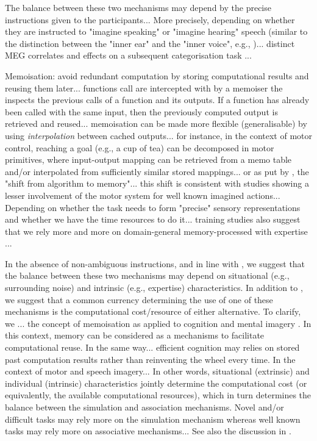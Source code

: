 \documentclass[utf8]{template/frontiersSCNS} %
\begin{document}
The balance between these two mechanisms may depend by the precise instructions given to the participants... More precisely, depending on whether they are instructed to "imagine speaking" or "imagine hearing" speech (similar to the distinction between the "inner ear" and the "inner voice", e.g., \cite{smith_subvocalization_1992})... distinct MEG correlates and effects on a subsequent categorisation task \citep{ma_distinct_2019}...

Memoisation: avoid redundant computation by storing computational results and reusing them later... functions call are intercepted with by a memoiser the inspects the previous calls of a function and its outputs. If a function has already been called with the same input, then the previously computed output is retrieved and reused... memoisation can be made more flexible (generalisable) by using \textit{interpolation} between cached outputs... for instance, in the context of motor control, reaching a goal (e.g., a cup of tea) can be decomposed in motor primitives, where input-output mapping can be retrieved from a memo table and/or interpolated from sufficiently similar stored mappings... or as put by \cite{dasgupta_memory_2021}, the "shift from algorithm to memory"... this shift is consistent with studies showing a lesser involvement of the motor system for well known imagined actions... Depending on whether the task needs to form "precise" sensory representations and whether we have the time resources to do it... training studies also suggest that we rely more and more on domain-general memory-processed with expertise \cite{tarr_mental_1989, jolicoeur_time_1985}...

In the absence of non-ambiguous instructions, and in line with \cite{tian_mental_2012}, we suggest that the balance between these two mechanisms may depend on situational (e.g., surrounding noise) and intrinsic (e.g., expertise) characteristics. In addition to \cite{tian_mental_2012}, we suggest that a common currency determining the use of one of these mechanisms is the computational cost/resource of either alternative. To clarify, we ... the concept of memoisation as applied to cognition and mental imagery \citep{dasgupta_memory_2021}. In this context, memory can be considered as a mechanisms to facilitate computational reuse. In the same way... efficient cognition may relies on stored past computation results rather than reinventing the wheel every time. In the context of motor and speech imagery... In other words, situational (extrinsic) and individual (intrinsic) characteristics jointly determine the computational cost (or equivalently, the available computational resources), which in turn determines the balance between the simulation and association mechanisms. Novel and/or difficult tasks may rely more on the simulation mechanism whereas well known tasks may rely more on associative mechanisms... See also the discussion in \citep{nalborczyk_understanding_2019-1, nalborczyk_re-analysing_2020}.
\end{document}
